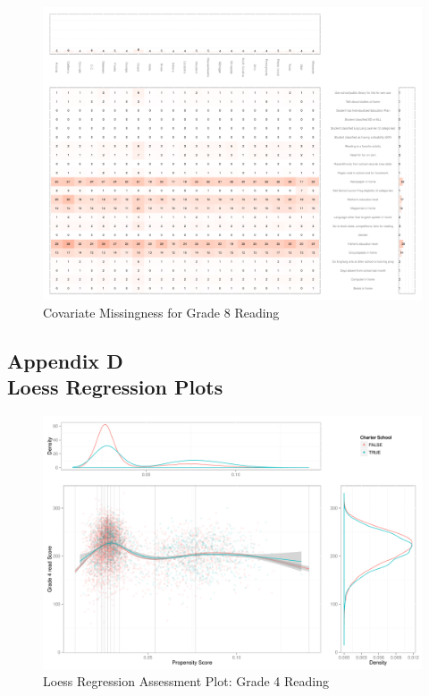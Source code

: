 \begin{figure}[h]
\begin{center}
\includegraphics[width=\textwidth]{../Figures2009/g8read-missing.pdf}
\caption{Covariate Missingness for Grade 8 Reading}
\label{fig:g8reading:missing}
\end{center}
\end{figure}


\clearpage
{}
\subsection*{Appendix D\\Loess Regression Plots}

\begin{figure}[h!]
\begin{center}
\includegraphics[height=.4\textheight]{../Figures2009/g4read-loess.pdf}
\caption{Loess Regression Assessment Plot: Grade 4 Reading}
\label{fig:g4read:loess}
\end{center}
\end{figure}

